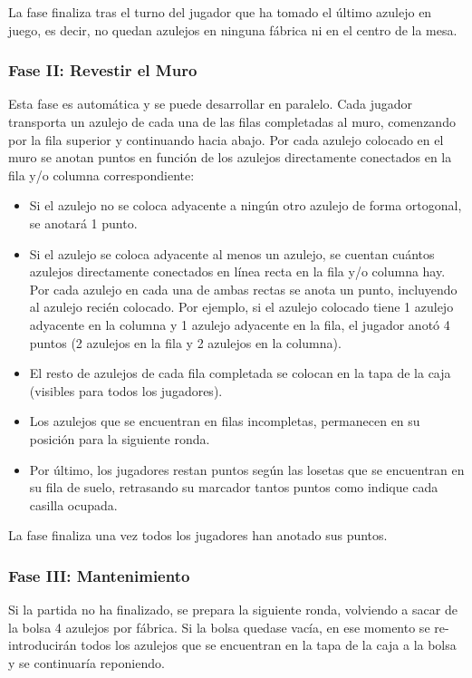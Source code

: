 \documentclass[11pt]{article}
\begin{document}
La fase finaliza tras el turno del jugador que ha tomado el último azulejo en juego, es decir, no quedan azulejos en ninguna fábrica ni en el centro de la mesa.

\subsubsection{Fase II: Revestir el Muro}

Esta fase es automática y se puede desarrollar en paralelo. Cada jugador transporta un azulejo de cada una de las filas completadas al muro, comenzando por la fila superior y continuando hacia abajo. Por cada azulejo colocado en el muro se anotan puntos en función de los azulejos directamente conectados en la fila y/o columna correspondiente:

\begin{itemize}
	\item Si el azulejo no se coloca adyacente a ningún otro azulejo de forma ortogonal, se anotará 1 punto.
	\item Si el azulejo se coloca adyacente al menos un azulejo, se cuentan cuántos azulejos directamente conectados en línea recta en la fila y/o columna hay. Por cada azulejo en cada una de ambas rectas se anota un punto, incluyendo al azulejo recién colocado. Por ejemplo, si el azulejo colocado tiene 1 azulejo adyacente en la columna y 1 azulejo adyacente en la fila, el jugador anotó 4 puntos (2 azulejos en la fila y 2 azulejos en la columna).
	\item El resto de azulejos de cada fila completada se colocan en la tapa de la caja (visibles para todos los jugadores).
	\item Los azulejos que se encuentran en filas incompletas, permanecen en su posición para la siguiente ronda.
	\item Por último, los jugadores restan puntos según las losetas que se encuentran en su fila de suelo, retrasando su marcador tantos puntos como indique cada casilla ocupada.
\end{itemize}

La fase finaliza una vez todos los jugadores han anotado sus puntos.

\subsubsection{Fase III: Mantenimiento}

Si la partida no ha finalizado, se prepara la siguiente ronda, volviendo a sacar de la bolsa 4 azulejos por fábrica. Si la bolsa quedase vacía, en ese momento se re-introducirán todos los azulejos que se encuentran en la tapa de la caja a la bolsa y se continuaría reponiendo.
\end{document}
